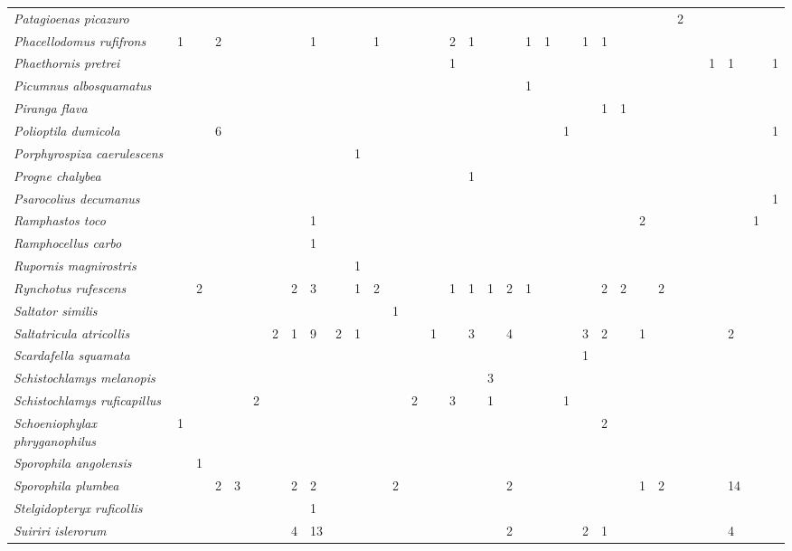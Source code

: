 \begin{longtable}[c]{@{}lllllllllllllllllllllllllllllllll@{}}
\emph{Patagioenas picazuro} & & & & & & & & & & & & & & & & & & & & & &
& & & & & 2 & & & & &\tabularnewline
\emph{Phacellodomus rufifrons} & 1 & & 2 & & & & & 1 & & & 1 & & & & 2 &
1 & & & 1 & 1 & & 1 & 1 & & & & & & & & &\tabularnewline
\emph{Phaethornis pretrei} & & & & & & & & & & & & & & & 1 & & & & & & &
& & & & & & & 1 & 1 & & 1\tabularnewline
\emph{Picumnus albosquamatus} & & & & & & & & & & & & & & & & & & & 1 &
& & & & & & & & & & & &\tabularnewline
\emph{Piranga flava} & & & & & & & & & & & & & & & & & & & & & & & 1 & 1
& & & & & & & &\tabularnewline
\emph{Polioptila dumicola} & & & 6 & & & & & & & & & & & & & & & & & & 1
& & & & & & & & & & & 1\tabularnewline
\emph{Porphyrospiza caerulescens} & & & & & & & & & & 1 & & & & & & & &
& & & & & & & & & & & & & &\tabularnewline
\emph{Progne chalybea} & & & & & & & & & & & & & & & & 1 & & & & & & & &
& & & & & & & &\tabularnewline
\emph{Psarocolius decumanus} & & & & & & & & & & & & & & & & & & & & & &
& & & & & & & & & & 1\tabularnewline
\emph{Ramphastos toco} & & & & & & & & 1 & & & & & & & & & & & & & & & &
& 2 & & & & & & 1 &\tabularnewline
\emph{Ramphocellus carbo} & & & & & & & & 1 & & & & & & & & & & & & & &
& & & & & & & & & &\tabularnewline
\emph{Rupornis magnirostris} & & & & & & & & & & 1 & & & & & & & & & & &
& & & & & & & & & & &\tabularnewline
\emph{Rynchotus rufescens} & & 2 & & & & & 2 & 3 & & 1 & 2 & & & & 1 & 1
& 1 & 2 & 1 & & & & 2 & 2 & & 2 & & & & & &\tabularnewline
\emph{Saltator similis} & & & & & & & & & & & & 1 & & & & & & & & & & &
& & & & & & & & &\tabularnewline
\emph{Saltatricula atricollis} & & & & & & 2 & 1 & 9 & 2 & 1 & & & & 1 &
& 3 & & 4 & & & & 3 & 2 & & 1 & & & & & 2 & &\tabularnewline
\emph{Scardafella squamata} & & & & & & & & & & & & & & & & & & & & & &
1 & & & & & & & & & &\tabularnewline
\emph{Schistochlamys melanopis} & & & & & & & & & & & & & & & & & 3 & &
& & & & & & & & & & & & &\tabularnewline
\emph{Schistochlamys ruficapillus} & & & & & 2 & & & & & & & & 2 & & 3 &
& 1 & & & & 1 & & & & & & & & & & &\tabularnewline
\emph{Schoeniophylax phryganophilus} & 1 & & & & & & & & & & & & & & & &
& & & & & & 2 & & & & & & & & &\tabularnewline
\emph{Sporophila angolensis} & & 1 & & & & & & & & & & & & & & & & & & &
& & & & & & & & & & &\tabularnewline
\emph{Sporophila plumbea} & & & 2 & 3 & & & 2 & 2 & & & & 2 & & & & & &
2 & & & & & & & 1 & 2 & & & & 14 & &\tabularnewline
\emph{Stelgidopteryx ruficollis} & & & & & & & & 1 & & & & & & & & & & &
& & & & & & & & & & & & &\tabularnewline
\emph{Suiriri islerorum} & & & & & & & 4 & 13 & & & & & & & & & & 2 & &
& & 2 & 1 & & & & & & & 4 & &\tabularnewline

\end{longtable}
